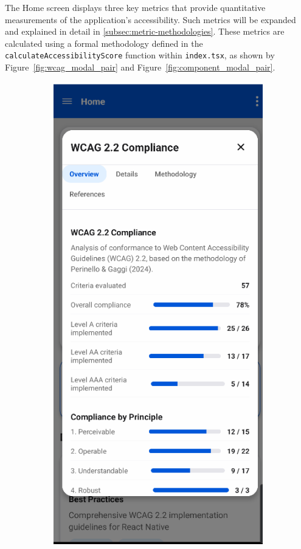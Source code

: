 The Home screen displays three key metrics that provide quantitative measurements of the application's accessibility. Such metrics will be expanded and explained in detail in \ref{subsec:metric-methodologies}. These metrics are calculated using a formal methodology defined in the \texttt{calculateAccessibilityScore} function within \texttt{index.tsx}, as shown by Figure~\ref{fig:wcag_modal_pair} and Figure~\ref{fig:component_modal_pair}.

\begin{figure}[ht]
    \centering
    \begin{subfigure}[b]{0.48\textwidth}
        \centering
        \includegraphics[width=\linewidth]{img/wcag-compliance.png}

\end{subfigure}
\end{figure}
